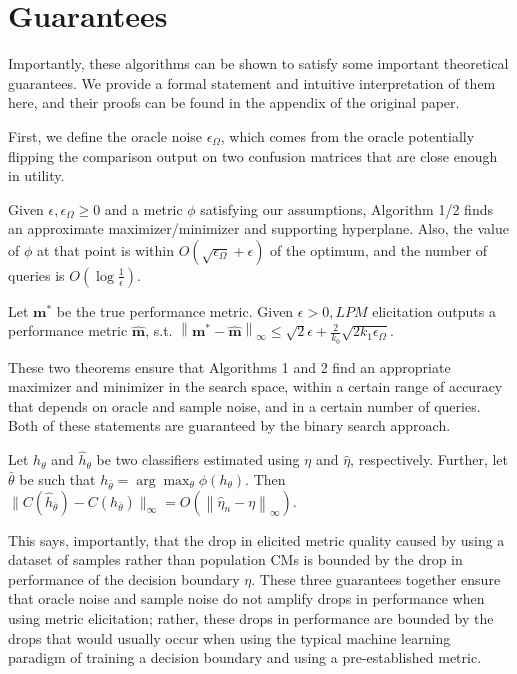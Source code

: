 \documentclass[
  letterpaper,
  numbers=noenddot,
  DIV=11,
  oneside]{scrreprt}
\theoremstyle{remark}
\begin{document}
\section{Guarantees}\label{sec-orga500da2}

Importantly, these algorithms can be shown to satisfy some important
theoretical guarantees. We provide a formal statement and intuitive
interpretation of them here, and their proofs can be found in the
appendix of the original paper.

First, we define the oracle noise \(\epsilon_{\Omega}\), which comes
from the oracle potentially flipping the comparison output on two
confusion matrices that are close enough in utility.

Given \(\epsilon, \epsilon_{\Omega} \geq 0\) and a metric \(\phi\)
satisfying our assumptions, Algorithm 1/2 finds an approximate
maximizer/minimizer and supporting hyperplane. Also, the value of
\(\phi\) at that point is within
\(O\left(\sqrt{\epsilon_{\Omega}}+\epsilon\right)\) of the optimum, and
the number of queries is \(O\left(\log \frac{1}{\epsilon}\right)\).

Let \(\mathbf{m}^{*}\) be the true performance metric. Given
\(\epsilon>0, L P M\) elicitation outputs a performance metric
\(\hat{\mathbf{m}}\), s.t.
\(\left\|\mathbf{m}^{*}-\hat{\mathbf{m}}\right\|_{\infty} \leq \sqrt{2} \epsilon+\frac{2}{k_{0}} \sqrt{2 k_{1} \epsilon_{\Omega}}\).

These two theorems ensure that Algorithms 1 and 2 find an appropriate
maximizer and minimizer in the search space, within a certain range of
accuracy that depends on oracle and sample noise, and in a certain
number of queries. Both of these statements are guaranteed by the binary
search approach.

Let \(h_{\theta}\) and \(\hat{h}_{\theta}\) be two classifiers estimated
using \(\eta\) and \(\hat{\eta}\), respectively. Further, let
\(\bar{\theta}\) be such that
\(h_{\bar{\theta}}=\arg \max _{\theta} \phi\left(h_{\theta}\right)\).
Then
\(\|C(\hat{h}_{\bar{\theta}})-C\left(h_{\bar{\theta}}\right)\|_{\infty}=O\left(\left\|\hat{\eta}_{n}-\eta\right\|_{\infty}\right)\).

This says, importantly, that the drop in elicited metric quality caused
by using a dataset of samples rather than population CMs is bounded by
the drop in performance of the decision boundary \(\eta\). These three
guarantees together ensure that oracle noise and sample noise do not
amplify drops in performance when using metric elicitation; rather,
these drops in performance are bounded by the drops that would usually
occur when using the typical machine learning paradigm of training a
decision boundary and using a pre-established metric.
\end{document}
